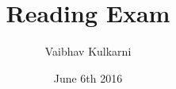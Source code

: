\documentclass[12pt, a4paper]{article}
\begin{document}
\pagestyle{fancy}

\title{Reading Exam}
\author{Vaibhav Kulkarni}
\date{June 6th 2016}
\maketitle

\thispagestyle{empty}

\newpage

\fancyhead[C]{}
\fancyhead[L]{}
\fancyhead[R]{} 
\fancyfoot[L]{}
\fancyfoot[C]{} 

\setcounter{tocdepth}{1}
\tableofcontents








\newpage


\end{document}
